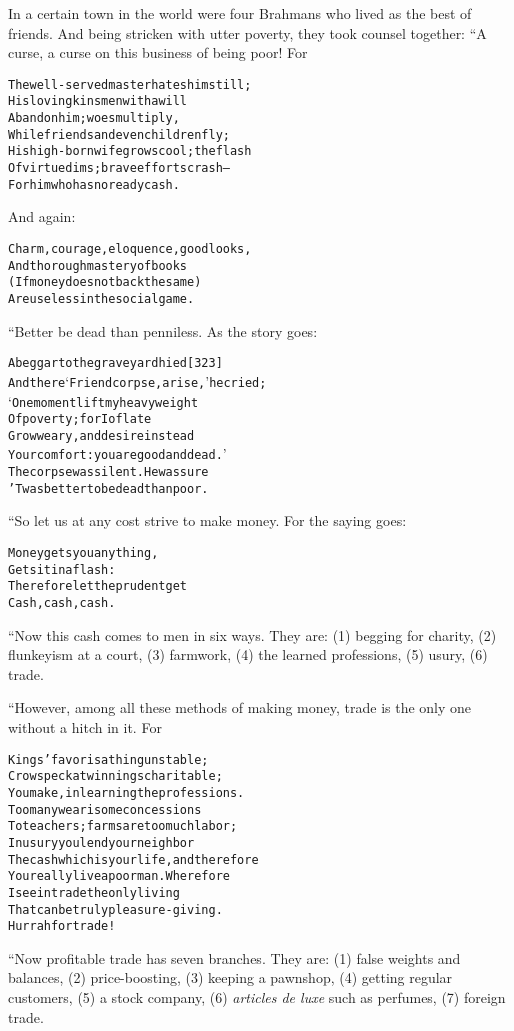 \documentclass{article}
\renewenvironment{verbatim}{\begin{alltt}\normalfont\begin{centering}}{\end{centering}\end{alltt}}
\begin{document}
In a certain town in the world were four Brahmans who lived as the
best of friends. And being stricken with utter poverty, they took
counsel together: “A curse, a curse on this business of being poor!
For

\begin{verbatim}
The well-served master hates him still;
His loving kinsmen with a will
Abandon him; woes multiply,
While friends and even children fly;
His high-born wife grows cool; the flash
Of virtue dims; brave efforts crash--
For him who has no ready cash.
\end{verbatim}
And again:

\begin{verbatim}
Charm, courage, eloquence, good looks,
And thorough mastery of books
(If money does not back the same)
Are useless in the social game.
\end{verbatim}
“Better be dead than penniless. As the story goes:

\begin{verbatim}
A beggar to the graveyard hied                          [323]
And there ‘Friend corpse, arise,’ he cried;
‘One moment lift my heavy weight
Of poverty; for I of late
Grow weary, and desire instead
Your comfort: you are good and dead.’
The corpse was silent. He was sure
'Twas better to be dead than poor.
\end{verbatim}
“So let us at any cost strive to make money. For the saying goes:

\begin{verbatim}
Money gets you anything,
    Gets it in a flash:
Therefore let the prudent get
    Cash, cash, cash.
\end{verbatim}
“Now this cash comes to men in six ways. They are: (1) begging for
charity, (2) flunkeyism at a court, (3) farmwork, (4) the learned
professions, (5) usury, (6) trade.

“However, among all these methods of making money, trade is the
only one without a hitch in it. For

\begin{verbatim}
Kings' favor is a thing unstable;
Crows peck at winnings charitable;
You make, in learning the professions.
Too many wearisome concessions
To teachers; farms are too much labor;
In usury you lend your neighbor
The cash which is your life, and therefore
You really live a poor man. Wherefore
I see in trade the only living
That can be truly pleasure-giving.
Hurrah for trade!
\end{verbatim}
“Now profitable trade has seven branches. They are: (1) false
weights and balances, (2) price-boosting, (3) keeping a pawnshop,
(4) getting regular customers, (5) a stock company, (6)
\emph{articles de luxe} such as perfumes, (7) foreign trade.
\end{document}
